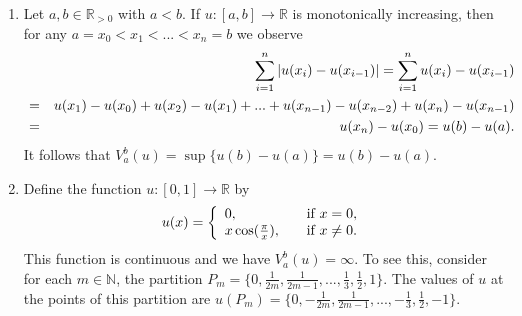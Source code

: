     \begin{example} %
    \label{ex:total_variation_one_d}

        \begin{enumerate}
            \item Let $a, b \in \mathbb{R}_{> 0}$ with $a < b$. If $u: [a, b] \longrightarrow \mathbb{R}$ is monotonically increasing, then for any $a = x_{0} < x_{1} < ... < x_{n} = b$ we observe
                \begin{eqnarray}
                    &&\sum_{i = 1}^{n} |u(x_{i}) - u(x_{i-1})| = \sum_{i = 1}^{n} u(x_{i}) - u(x_{i-1}) \notag \\
                    &=& u(x_{1}) - u(x_{0}) + u(x_{2}) - u(x_{1}) + ... + u(x_{n-1}) - u(x_{n-2}) + u(x_{n}) - u(x_{n-1}) \notag \\
                    &=& u(x_{n}) - u(x_{0}) = u(b) - u(a). \notag
                \end{eqnarray}
            It follows that $V^{b}_{a}(u) = \sup \{u(b) - u(a)\} = u(b) - u(a)$.
            \item Define the function $u: [0, 1] \longrightarrow \mathbb{R}$ by
                \begin{equation}
                    u(x) =
                    \left\{
                        \begin{array}{l l}
                            0,                      & \quad \text{if $x = 0$}, \\
                            x \cos(\frac{\pi}{x}),  & \quad \text{if $x \ne 0$}.
                        \end{array}
                    \right.
                \end{equation}
            This function is continuous and we have $V^{b}_{a}(u) = \infty$. To see this, consider for each $m \in \mathbb{N}$, the partition $P_{m} = \{ 0, \frac{1}{2m}, \frac{1}{2m-1}, ..., \frac{1}{3}, \frac{1}{2}, 1 \}$. The values of $u$ at the points of this partition are $u(P_{m}) = \{ 0, -\frac{1}{2m}, \frac{1}{2m-1}, ..., -\frac{1}{3}, \frac{1}{2}, -1 \}$.



\end{enumerate}
\end{example}
